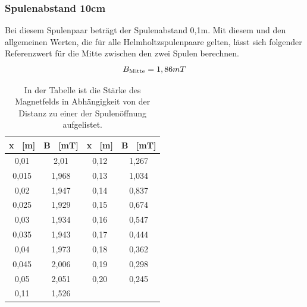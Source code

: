 \documentclass[titlepage = firstcover]{scrartcl}
\begin{document}
            \subsubsection{Spulenabstand 10cm}
            Bei diesem Spulenpaar beträgt der Spulenabstand 0,1m. Mit diesem und den allgemeinen Werten, die für alle Helmholtzspulenpaare gelten, lässt sich
            folgender Referenzwert für die Mitte zwischen den zwei Spulen berechnen.
            \begin{equation}
                B_{\text{Mitte}} = 1,86 mT\\
                \label{eqn:HelmA}
            \end{equation}
            \begin{table}[h]
                \centering 
                \caption{In der Tabelle ist die Stärke des Magnetfelds in Abhängigkeit von der Distanz zu einer der Spulenöffnung aufgelistet.}
                \label{tab:HelmholtzA}

                \begin{tabular}{c c c c}
                    \toprule
                    {x \ [m]} & {B \ [mT]} & {x \ [m]} & {B \ [mT]} \\
                    \midrule
                    0,01  & 2,01  & 0,12 & 1,267 \\
                    0,015 & 1,968 & 0,13 & 1,034 \\
                    0,02  & 1,947 & 0,14 & 0,837 \\
                    0,025 & 1,929 & 0,15 & 0,674 \\
                    0,03  & 1,934 & 0,16 & 0,547 \\
                    0,035 & 1,943 & 0,17 & 0,444 \\
                    0,04  & 1,973 & 0,18 & 0,362 \\
                    0,045 & 2,006 & 0,19 & 0,298 \\
                    0,05  & 2,051 & 0,20 & 0,245 \\
                    0,11  & 1,526 & & \\
                    \bottomrule
                \end{tabular}                
            \end{table}
\end{document}

